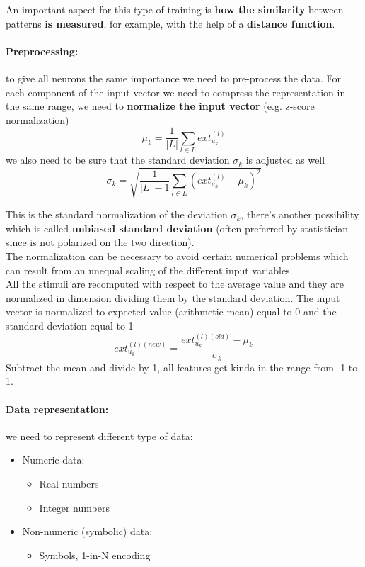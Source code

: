 \documentclass[11pt]{article}
\begin{document}
		An important aspect for this type of training is \textbf{how the similarity} between patterns \textbf{is measured}, for example, with the help of a \textbf{distance function}. \\
		
		\paragraph{Preprocessing:} to give all neurons the same importance we need to pre-process the data. For each component of the input vector we need to compress the representation in the same range, we need to \textbf{normalize the input vector} (e.g. z-score normalization)
		$$ \mu_k = \frac{1}{|L|} \sum_{l \in L} ext_{u_k}^{(l)}$$
		we also need to be sure that the standard deviation $\sigma_k$ is adjusted as well
		$$ \sigma_k = \sqrt{\frac{1}{|L| - 1} \sum_{l \in L} \left(ext_{u_k}^{(l)} - \mu_k \right)^2}$$
		
		This is the standard normalization of the deviation $\sigma_k$, there's another possibility which is called \textbf{unbiased standard deviation} (often preferred by statistician since is not polarized on the two direction).\\
		
		The normalization can be necessary to avoid certain numerical problems which can result from an unequal scaling of the different input variables.\\
		
		All the stimuli are recomputed with respect to the average value and they are normalized in dimension dividing them by the standard deviation. The input vector is normalized to expected value (arithmetic mean) equal to 0 and the standard deviation equal to 1
		$$ ext_{u_k}^{(l)(new)} = \frac{ext_{u_k}^{(l)(old)} - \mu_k}{\sigma_k} $$
		Subtract the mean and divide by 1, all features get kinda in the range from -1 to 1.\\
		
		\paragraph{Data representation:} we need to represent different type of data: 
		\begin{itemize}
			\item Numeric data: 
			\begin{itemize}
				\item Real numbers 
				\item Integer numbers
			\end{itemize}
			\nn
			
			\item Non-numeric (symbolic) data: 
			\begin{itemize}
				\item Symbols, 1-in-N encoding
			\end{itemize}
		\end{itemize}
		
\end{document}
